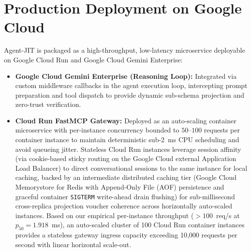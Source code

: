 \documentclass[conference,10pt]{IEEEtran}
\begin{document}
\section{Production Deployment on Google Cloud}
Agent-JIT is packaged as a high-throughput, low-latency microservice deployable on Google Cloud Run and Google Cloud Gemini Enterprise:
\begin{itemize}
    \item \textbf{Google Cloud Gemini Enterprise (Reasoning Loop):} Integrated via custom middleware callbacks in the agent execution loop, intercepting prompt preparation and tool dispatch to provide dynamic sub-schema projection and zero-trust verification.
    \item \textbf{Cloud Run FastMCP Gateway:} Deployed as an auto-scaling container microservice with per-instance concurrency bounded to $50$--$100$ requests per container instance to maintain deterministic sub-2~ms CPU scheduling and avoid queueing jitter. Stateless Cloud Run instances leverage session affinity (via cookie-based sticky routing on the Google Cloud external Application Load Balancer) to direct conversational sessions to the same instance for local caching, backed by an intermediate distributed caching tier (Google Cloud Memorystore for Redis with Append-Only File (AOF) persistence and graceful container \texttt{SIGTERM} write-ahead drain flushing) for sub-millisecond cross-replica projection voucher coherence across horizontally auto-scaled instances. Based on our empirical per-instance throughput ($>100$~req/s at $p_{50} = 1.918$~ms), an auto-scaled cluster of 100 Cloud Run container instances provides a stateless gateway ingress capacity exceeding 10,000 requests per second with linear horizontal scale-out.

\end{itemize}
\end{document}
